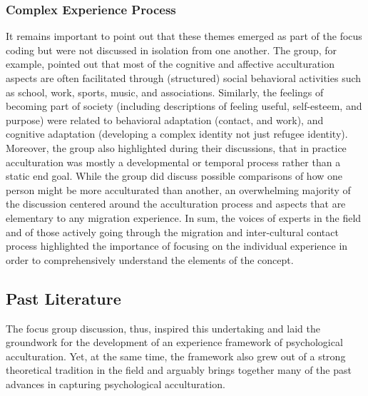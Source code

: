 \documentclass[man, 12pt, a4paper]{apa7}
\begin{document}
\subsubsection{Complex Experience Process}
It remains important to point out that these themes emerged as part of the focus coding but were not discussed in isolation from one another. The group, for example, pointed out that most of the cognitive and affective acculturation aspects are often facilitated through (structured) social behavioral activities such as school, work, sports, music, and associations. Similarly, the feelings of becoming part of society (including descriptions of feeling useful, self-esteem, and purpose) were related to behavioral adaptation (contact, and work), and cognitive adaptation (developing a complex identity not just refugee identity). Moreover, the group also highlighted during their discussions, that in practice acculturation was mostly a developmental or temporal process rather than a static end goal. While the group did discuss possible comparisons of how one person might be more acculturated than another, an overwhelming majority of the discussion centered around the acculturation process and aspects that are elementary to any migration experience. In sum, the voices of experts in the field and of those actively going through the migration and inter-cultural contact process highlighted the importance of focusing on the individual experience in order to comprehensively understand the elements of the concept.

\subsection{Past Literature}
The focus group discussion, thus, inspired this undertaking and laid the groundwork for the development of an experience framework of psychological acculturation. Yet, at the same time, the framework also grew out of a strong theoretical tradition in the field and arguably brings together many of the past advances in capturing psychological acculturation.
\end{document}
